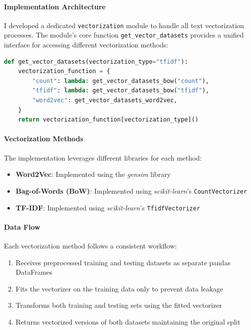 \documentclass[12pt]{article}
\begin{document}
\paragraph{Implementation Architecture}
I developed a dedicated \texttt{vectorization} module to handle all text vectorization processes. The module's core function \texttt{get\_vector\_datasets} provides a unified interface for accessing different vectorization methods:

\begin{lstlisting}[language=Python]
def get_vector_datasets(vectorization_type="tfidf"):
    vectorization_function = {
        "count": lambda: get_vector_datasets_bow("count"),
        "tfidf": lambda: get_vector_datasets_bow("tfidf"),
        "word2vec": get_vector_datasets_word2vec,
    }
    return vectorization_function[vectorization_type]()
\end{lstlisting}

\paragraph{Vectorization Methods}
The implementation leverages different libraries for each method:
\begin{itemize}
    \item \textbf{Word2Vec}: Implemented using the \textit{gensim} library
    \item \textbf{Bag-of-Words (BoW)}: Implemented using \textit{scikit-learn}'s \texttt{CountVectorizer}
    \item \textbf{TF-IDF}: Implemented using \textit{scikit-learn}'s \texttt{TfidfVectorizer}
\end{itemize}

\paragraph{Data Flow}
Each vectorization method follows a consistent workflow:
\begin{enumerate}
    \item Receives preprocessed training and testing datasets as separate pandas DataFrames
    \item Fits the vectorizer on the training data only to prevent data leakage
    \item Transforms both training and testing sets using the fitted vectorizer
    \item Returns vectorized versions of both datasets maintaining the original split
\end{enumerate}
\end{document}
